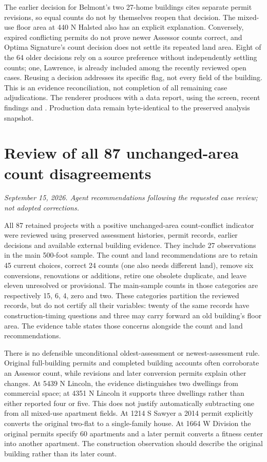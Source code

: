The earlier decision for Belmont's two 27-home buildings cites
separate permit revisions, so equal counts do not by themselves
reopen that decision. The mixed-use floor area at 440 N Halsted also
has an explicit explanation. Conversely, expired conflicting permits
do not prove newer Assessor counts correct, and Optima Signature's
count decision does not settle its repeated land area. Eight of the
64 older decisions rely on a source preference without independently
settling counts; one, Lawrence, is already included among the recently
reviewed open cases. Reusing a decision addresses its specific flag,
not every field of the building. This is an evidence reconciliation,
not completion of all remaining case adjudications. The renderer
produces  with a data report, using the
screen, recent findings and . Production
data remain byte-identical to the preserved analysis snapshot.

\clearpage
\section*{Review of all 87 unchanged-area count disagreements}
\textit{September 15, 2026. Agent recommendations following the requested case review; not adopted corrections.}

All 87 retained projects with a positive unchanged-area count-conflict
indicator were reviewed using preserved assessment histories, permit
records, earlier decisions and available external building evidence.
They include 27 observations in the main 500-foot sample. The count and
land recommendations are to retain 45 current choices, correct 24
counts (one also needs different land), remove six conversions,
renovations or additions, retire one obsolete duplicate, and leave
eleven unresolved or provisional. The main-sample counts in those
categories are respectively 15, 6, 4, zero and two. These categories
partition the reviewed records, but do not certify all their variables:
twenty of the same records have construction-timing questions and three
may carry forward an old building's floor area. The evidence table
states those concerns alongside the count and land recommendations.

There is no defensible unconditional oldest-assessment or
newest-assessment rule. Original full-building permits and completed
building accounts often corroborate an Assessor count, while revisions
and later conversion permits explain other changes. At 5439 N Lincoln,
the evidence distinguishes two dwellings from commercial space; at
4351 N Lincoln it supports three dwellings rather than either reported
four or five. This does not justify automatically subtracting one from
all mixed-use apartment fields. At 1214 S Sawyer a 2014 permit explicitly
converts the original two-flat to a single-family house. At 1664 W
Division the original permits specify 60 apartments and a later permit
converts a fitness center into another apartment. The construction
observation should describe the original building rather than its
later count.

